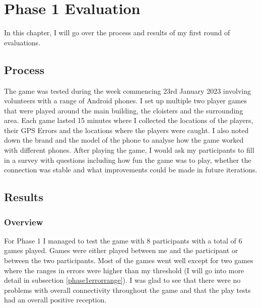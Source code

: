 \documentclass{l4proj}
\begin{document}
\chapter{Phase 1 Evaluation}
\label{Evaluation} 

In this chapter, I will go over the process and results of my first round of evaluations.

\section{Process}
The game was tested during the week commencing 23rd January 2023 involving volunteers with a range of Android phones. I set up multiple two player
games that were played around the main building, the cloisters and the surrounding area. Each game lasted 15 minutes where I collected the locations
of the players, their GPS Errors and the locations where the players were caught. I also noted down the brand and the model of the phone to analyse
how the game worked with different phones. After playing the game, I would ask my participants to fill in a survey with questions including how
fun the game was to play, whether the connection was stable and what improvements could be made in future iterations.

\section{Results}
\label{phase1results}

\subsection{Overview}
For Phase 1 I managed to test the game with 8 participants with a total of 6 games played. Games were either played between me and the participant
or between the two participants. Most of the games went well except for two games where the ranges in errors were higher than my threshold
(I will go into more detail in subsection \ref{phase1errorrange}). I was glad to see that there were no problems with overall connectivity throughout
the game and that the play tests had an overall positive reception.
\end{document}
